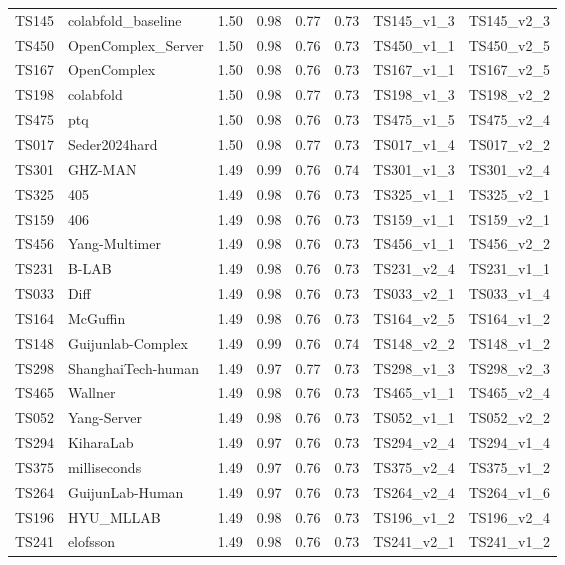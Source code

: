 \begin{longtable}{llllllll}
TS145 & colabfold\_baseline & 1.50 & 0.98 & 0.77 & 0.73 & TS145\_v1\_3 & TS145\_v2\_3 \\ 
TS450 & OpenComplex\_Server & 1.50 & 0.98 & 0.76 & 0.73 & TS450\_v1\_1 & TS450\_v2\_5 \\ 
TS167 & OpenComplex & 1.50 & 0.98 & 0.76 & 0.73 & TS167\_v1\_1 & TS167\_v2\_5 \\ 
TS198 & colabfold & 1.50 & 0.98 & 0.77 & 0.73 & TS198\_v1\_3 & TS198\_v2\_2 \\ 
TS475 & ptq & 1.50 & 0.98 & 0.76 & 0.73 & TS475\_v1\_5 & TS475\_v2\_4 \\ 
TS017 & Seder2024hard & 1.50 & 0.98 & 0.77 & 0.73 & TS017\_v1\_4 & TS017\_v2\_2 \\ 
TS301 & GHZ-MAN & 1.49 & 0.99 & 0.76 & 0.74 & TS301\_v1\_3 & TS301\_v2\_4 \\ 
TS325 & 405 & 1.49 & 0.98 & 0.76 & 0.73 & TS325\_v1\_1 & TS325\_v2\_1 \\ 
TS159 & 406 & 1.49 & 0.98 & 0.76 & 0.73 & TS159\_v1\_1 & TS159\_v2\_1 \\ 
TS456 & Yang-Multimer & 1.49 & 0.98 & 0.76 & 0.73 & TS456\_v1\_1 & TS456\_v2\_2 \\ 
TS231 & B-LAB & 1.49 & 0.98 & 0.76 & 0.73 & TS231\_v2\_4 & TS231\_v1\_1 \\ 
TS033 & Diff & 1.49 & 0.98 & 0.76 & 0.73 & TS033\_v2\_1 & TS033\_v1\_4 \\ 
TS164 & McGuffin & 1.49 & 0.98 & 0.76 & 0.73 & TS164\_v2\_5 & TS164\_v1\_2 \\ 
TS148 & Guijunlab-Complex & 1.49 & 0.99 & 0.76 & 0.74 & TS148\_v2\_2 & TS148\_v1\_2 \\ 
TS298 & ShanghaiTech-human & 1.49 & 0.97 & 0.77 & 0.73 & TS298\_v1\_3 & TS298\_v2\_3 \\ 
TS465 & Wallner & 1.49 & 0.98 & 0.76 & 0.73 & TS465\_v1\_1 & TS465\_v2\_4 \\ 
TS052 & Yang-Server & 1.49 & 0.98 & 0.76 & 0.73 & TS052\_v1\_1 & TS052\_v2\_2 \\ 
TS294 & KiharaLab & 1.49 & 0.97 & 0.76 & 0.73 & TS294\_v2\_4 & TS294\_v1\_4 \\ 
TS375 & milliseconds & 1.49 & 0.97 & 0.76 & 0.73 & TS375\_v2\_4 & TS375\_v1\_2 \\ 
TS264 & GuijunLab-Human & 1.49 & 0.97 & 0.76 & 0.73 & TS264\_v2\_4 & TS264\_v1\_6 \\ 
TS196 & HYU\_MLLAB & 1.49 & 0.98 & 0.76 & 0.73 & TS196\_v1\_2 & TS196\_v2\_4 \\ 
TS241 & elofsson & 1.49 & 0.98 & 0.76 & 0.73 & TS241\_v2\_1 & TS241\_v1\_2 \\ 

\end{longtable}
